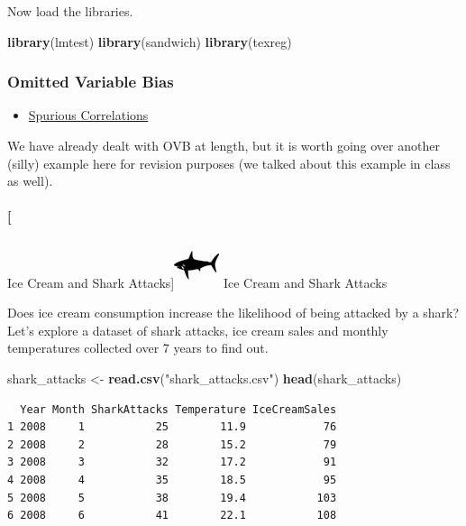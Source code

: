 \documentclass[]{article}
\newenvironment{Shaded}{\begin{snugshade}}{\end{snugshade}}
\newcommand{\KeywordTok}[1]{\textcolor[rgb]{0.13,0.29,0.53}{\textbf{#1}}}
\newcommand{\StringTok}[1]{\textcolor[rgb]{0.31,0.60,0.02}{#1}}
\newcommand{\NormalTok}[1]{#1}
\providecommand{\tightlist}{%
  \setlength{\itemsep}{0pt}\setlength{\parskip}{0pt}}
\let\oldparagraph\paragraph
\renewcommand{\paragraph}[1]{\oldparagraph{#1}\mbox{}}
\theoremstyle{definition}
\theoremstyle{definition}
\theoremstyle{definition}
\theoremstyle{remark}
\begin{document}
Now load the libraries.

\begin{Shaded}
\begin{Highlighting}[]
\KeywordTok{library}\NormalTok{(lmtest)}
\KeywordTok{library}\NormalTok{(sandwich)}
\KeywordTok{library}\NormalTok{(texreg)}
\end{Highlighting}
\end{Shaded}

\subsubsection{Omitted Variable Bias}\label{omitted-variable-bias}

\begin{itemize}
\tightlist
\item
  \href{http://tylervigen.com/spurious-correlations}{Spurious
  Correlations}
\end{itemize}

We have already dealt with OVB at length, but it is worth going over
another (silly) example here for revision purposes (we talked about this
example in class as well).

\paragraph[ Ice Cream and Shark
Attacks]{\texorpdfstring{\protect\includegraphics{./img/shark.png} Ice
Cream and Shark
Attacks}{ Ice Cream and Shark Attacks}}\label{ice-cream-and-shark-attacks}

Does ice cream consumption increase the likelihood of being attacked by
a shark? Let's explore a dataset of shark attacks, ice cream sales and
monthly temperatures collected over 7 years to find out.

\begin{Shaded}
\begin{Highlighting}[]
\NormalTok{shark_attacks <-}\StringTok{ }\KeywordTok{read.csv}\NormalTok{(}\StringTok{"shark_attacks.csv"}\NormalTok{)}
\KeywordTok{head}\NormalTok{(shark_attacks)}
\end{Highlighting}
\end{Shaded}

\begin{verbatim}
  Year Month SharkAttacks Temperature IceCreamSales
1 2008     1           25        11.9            76
2 2008     2           28        15.2            79
3 2008     3           32        17.2            91
4 2008     4           35        18.5            95
5 2008     5           38        19.4           103
6 2008     6           41        22.1           108
\end{verbatim}
\end{document}
